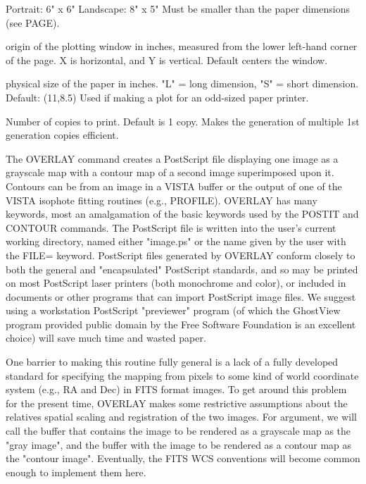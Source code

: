 \begin{command}
{                         Portrait:  6" x 6"\newline
                         Landscape: 8" x 5"\newline
                  Must be smaller than the paper dimensions (see PAGE).}
  \item[ORIGIN=(x,y)]{origin of the plotting window in inches, measured from 
                  the lower left-hand corner of the page.  X is horizontal, 
                  and Y is vertical.  Default centers the window.}
  \item[PAGE=(L,S)]{physical size of the paper in inches.  "L" = long 
                  dimension, "S" = short dimension.  Default: (11,8.5)
                  Used if making a plot for an odd-sized paper printer.}
  \item[COPIES=n]{Number of copies to print.  Default is 1 copy.  Makes the
                  generation of multiple 1st generation copies efficient.}
\end{command}

The OVERLAY command creates a PostScript file displaying one image as a
grayscale map with a contour map of a second image superimposed upon it.
Contours can be from an image in a VISTA buffer or the output of one of the
VISTA isophote fitting routines (e.g., PROFILE).  OVERLAY has many
keywords, most an amalgamation of the basic keywords used by the POSTIT and
CONTOUR commands.  The PostScript file is written into the user's current
working directory, named either "image.ps" or the name given by the user
with the FILE= keyword.  PostScript files generated by OVERLAY conform
closely to both the general and "encapsulated" PostScript standards, and so
may be printed on most PostScript laser printers (both monochrome and
color), or included in documents or other programs that can import
PostScript image files.  We suggest using a workstation PostScript
"previewer" program (of which the GhostView program provided public domain
by the Free Software Foundation is an excellent choice) will save much time
and wasted paper.

One barrier to making this routine fully general is a lack of a fully
developed standard for specifying the mapping from pixels to some kind of
world coordinate system (e.g., RA and Dec) in FITS format images.  To get
around this problem for the present time, OVERLAY makes some restrictive
assumptions about the relatives spatial scaling and registration of the two
images.  For argument, we will call the buffer that contains the image to
be rendered as a grayscale map as the "gray image", and the buffer with the
image to be rendered as a contour map as the "contour image".  Eventually,
the FITS WCS conventions will become common enough to implement them here.

